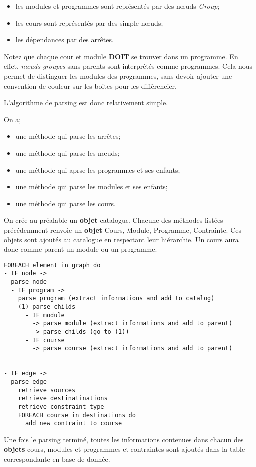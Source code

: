 \begin{itemize}
\item les modules et programmes sont représentés par des nœuds \textit{Group};
\item les cours sont représentés par des simple nœuds;
\item les dépendances par des arrêtes.
\end{itemize}

Notez que chaque cour et module \textbf{DOIT} se trouver dans un programme. En effet, \textit{nœuds groupes} sans parents sont interprétés comme programmes. Cela nous permet de distinguer les modules des programmes, sans devoir ajouter une convention de couleur sur les boites pour les différencier.  

L'algorithme de parsing est donc relativement simple.

On a;
\begin{itemize}
  \item une méthode qui parse les arrêtes; 
  \item une méthode qui parse les nœuds;
  \item une méthode qui aprse les programmes et ses enfants;
  \item une méthode qui parse les modules et ses enfants;
  \item une méthode qui parse les cours.
\end{itemize}

On crée au préalable un \textbf{objet} catalogue. Chacune des méthodes listées précédemment renvoie un \textbf{objet} Cours, Module, Programme, Contrainte. Ces objets sont ajoutés au catalogue en respectant leur hiérarchie. Un cours aura donc comme parent un module ou un programme. 


\begin{lstlisting}
FOREACH element in graph do
- IF node -> 
  parse node
  - IF program -> 
    parse program (extract informations and add to catalog)
    (1) parse childs
      - IF module
        -> parse module (extract informations and add to parent)
        -> parse childs (go_to (1))
      - IF course
        -> parse course (extract informations and add to parent)


- IF edge -> 
  parse edge
    retrieve sources
    retrieve destinatinations
    retrieve constraint type
    FOREACH course in destinations do
      add new contraint to course
\end{lstlisting}


Une fois le parsing terminé, toutes les informations contenues dans chacun des \textbf{objets} cours, modules et programmes et contraintes sont ajoutés dans la table correspondante en base de donnée. 


